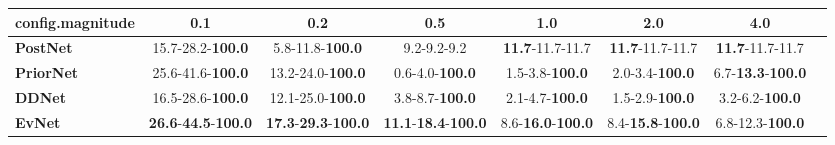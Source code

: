 \begin{tabular}{lccccccc}
\toprule
\textbf{config.magnitude} &                                         0.1 &                                         0.2 &                                         0.5 &                               1.0 &                               2.0 &                               4.0 \\
\midrule
\textbf{PostNet } &                    15.7-28.2-\textbf{100.0} &                     5.8-11.8-\textbf{100.0} &                                 9.2-9.2-9.2 &           \textbf{11.7}-11.7-11.7 &           \textbf{11.7}-11.7-11.7 &           \textbf{11.7}-11.7-11.7 \\
\textbf{PriorNet} &                    25.6-41.6-\textbf{100.0} &                    13.2-24.0-\textbf{100.0} &                      0.6-4.0-\textbf{100.0} &            1.5-3.8-\textbf{100.0} &            2.0-3.4-\textbf{100.0} &  6.7-\textbf{13.3}-\textbf{100.0} \\
\textbf{DDNet   } &                    16.5-28.6-\textbf{100.0} &                    12.1-25.0-\textbf{100.0} &                      3.8-8.7-\textbf{100.0} &            2.1-4.7-\textbf{100.0} &            1.5-2.9-\textbf{100.0} &            3.2-6.2-\textbf{100.0} \\
\textbf{EvNet   } &  \textbf{26.6}-\textbf{44.5}-\textbf{100.0} &  \textbf{17.3}-\textbf{29.3}-\textbf{100.0} &  \textbf{11.1}-\textbf{18.4}-\textbf{100.0} &  8.6-\textbf{16.0}-\textbf{100.0} &  8.4-\textbf{15.8}-\textbf{100.0} &           6.8-12.3-\textbf{100.0} \\
\bottomrule
\end{tabular}

